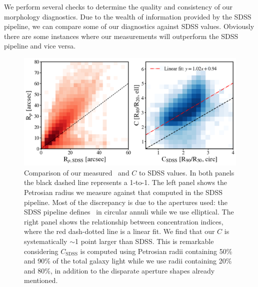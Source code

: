 We perform several checks to determine the quality and consistency of our morphology diagnostics. Due to the wealth of information provided by the SDSS pipeline, we can compare some of our diagnostics against SDSS values. Obviously there are some instances where our measurements will outperform the SDSS pipeline and vice versa. 

\begin{figure}
\centering
\includegraphics[width=\textwidth]{Figures/compare_Rp_concentrations.png}
\caption[Comparison of Petrosian radius and concentration index from this work to SDSS values]{Comparison of our measured \rp~and $C$ to SDSS values. In both panels the black dashed line represents a 1-to-1. The left panel shows the Petrosian radius we measure against that computed in the SDSS pipeline. Most of the discrepancy is due to the apertures used: the SDSS pipeline defines \rp~in circular annuli while we use elliptical. 
The right panel shows the relationship between concentration indices, where the red dash-dotted line is a linear fit. We find that our $C$ is systematically $\sim$1 point larger than SDSS. This is remarkable considering $C_{\mathrm{SDSS}}$ is computed using Petrosian radii containing 50\% and 90\% of the total galaxy light while we use radii containing 20\% and 80\%, in addition to the disparate aperture shapes already mentioned.}
\label{fig: Rp and C comparison}
\end{figure}

